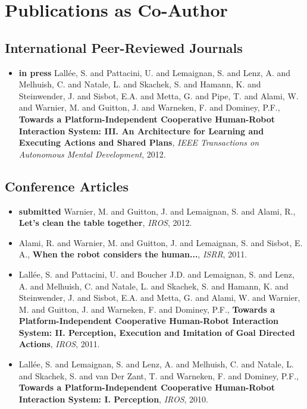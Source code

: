 \section{Publications as Co-Author}

\subsection {International Peer-Reviewed Journals}

\begin{itemize}
    \item{\textbf{in press} Lallée, S. and Pattacini, U. and Lemaignan, S. and Lenz, A. and Melhuish, C. and Natale, L. and Skachek, S. and Hamann, K. and Steinwender, J. and Sisbot, E.A. and Metta, G. and Pipe, T. and Alami, W. and Warnier, M. and Guitton, J. and Warneken, F. and Dominey, P.F., \textbf{Towards a Platform-Independent Cooperative Human-Robot Interaction System: III. An Architecture for Learning and Executing Actions and Shared Plans}, \textit{IEEE Transactions on Autonomous Mental Development}, 2012.}
\end{itemize}

\subsection {Conference Articles}

\begin{itemize}
    \item{\textbf{submitted} Warnier, M. and Guitton, J. and Lemaignan, S. and Alami, R., \textbf{Let’s clean the table together}, \textit{IROS}, 2012.}
    \item{Alami, R. and Warnier, M. and Guitton, J. and Lemaignan, S. and Sisbot, E. A., \textbf{When the robot considers the human...}, \textit{ISRR}, 2011.}
    \item{Lallée, S. and Pattacini, U. and Boucher J.D. and Lemaignan, S. and Lenz, A. and Melhuish, C. and Natale, L. and Skachek, S. and Hamann, K. and Steinwender, J. and Sisbot, E.A. and Metta, G. and Alami, W. and Warnier, M. and Guitton, J. and Warneken, F. and Dominey, P.F., \textbf{Towards a Platform-Independent Cooperative Human-Robot Interaction System: II. Perception, Execution and Imitation of Goal Directed Actions}, \textit{IROS}, 2011.} 
    \item{Lallée, S. and Lemaignan, S. and Lenz, A. and Melhuish, C. and Natale, L. and Skachek, S. and van Der Zant, T. and Warneken, F. and Dominey, P.F., \textbf{Towards a Platform-Independent Cooperative Human-Robot Interaction System: I. Perception}, \textit{IROS}, 2010.}
\end{itemize}


